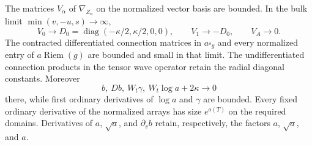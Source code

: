 \begin{lemma}
\label{pk2:coefficients}
The matrices $V_\alpha$ of $\nabla_{Z_\alpha}$ on the normalized
vector basis are bounded. In the bulk limit
$\min(v,-u,s)\to\infty$,
\[
 V_0\longrightarrow
 D_0=\operatorname{diag}(-\kappa/2,\kappa/2,0,0),
 \qquad V_1\longrightarrow-D_0,
 \qquad V_A\longrightarrow0.
\]
The contracted differentiated connection matrices in $a\square_g$
and every normalized entry of $a\operatorname{Riem}(g)$ are bounded
and small in that limit. The undifferentiated connection products in
the tensor wave operator retain the radial diagonal constants.
Moreover
\[
 b,\ Db,\ W_t\gamma,\ W_t\log a+2\kappa\longrightarrow0
\]
there, while first ordinary derivatives of $\log a$ and $\gamma$ are
bounded. Every fixed ordinary derivative of the normalized arrays
has size $e^{o(T)}$ on the required domains. Derivatives of $a$,
$\sqrt a$, and $\partial_vb$ retain, respectively, the factors
$a$, $\sqrt a$, and $a$.
\end{lemma}
